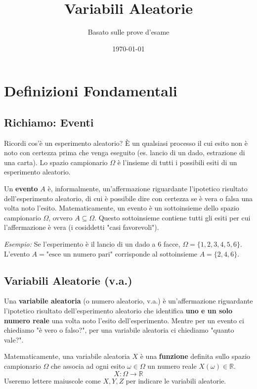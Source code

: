 

\title{Variabili Aleatorie}
\author{Basato sulle prove d'esame}
\date{\today}


\maketitle
\tableofcontents
\newpage

\section{Definizioni Fondamentali}

\subsection{Richiamo: Eventi}
Ricordi cos'è un esperimento aleatorio? È un qualsiasi processo il cui esito non è noto con certezza prima che venga eseguito (es. lancio di un dado, estrazione di una carta).
Lo spazio campionario $\Omega$ è l'insieme di tutti i possibili esiti di un esperimento aleatorio.

Un \textbf{evento} $A$ è, informalmente, un'affermazione riguardante l'ipotetico risultato dell'esperimento aleatorio, di cui è possibile dire con certezza se è vera o falsa una volta noto l'esito. Matematicamente, un evento è un sottoinsieme dello spazio campionario $\Omega$, ovvero $A \subseteq \Omega$. Questo sottoinsieme contiene tutti gli esiti per cui l'affermazione è vera (i cosiddetti "casi favorevoli").

\textit{Esempio:}
Se l'esperimento è il lancio di un dado a 6 facce, $\Omega = \{1, 2, 3, 4, 5, 6\}$.
L'evento $A = \text{"esce un numero pari"}$ corrisponde al sottoinsieme $A = \{2, 4, 6\}$.

\subsection{Variabili Aleatorie (v.a.)}
Una \textbf{variabile aleatoria} (o numero aleatorio, v.a.) è un'affermazione riguardante l'ipotetico risultato dell'esperimento aleatorio che identifica \textbf{uno e un solo numero reale} una volta noto l'esito dell'esperimento.
Mentre per un evento ci chiediamo "è vero o falso?", per una variabile aleatoria ci chiediamo "quanto vale?".

Matematicamente, una variabile aleatoria $X$ è una \textbf{funzione} definita sullo spazio campionario $\Omega$ che associa ad ogni esito $\omega \in \Omega$ un numero reale $X(\omega) \in \mathbb{R}$.
\[ X: \Omega \to \mathbb{R} \]
Useremo lettere maiuscole come $X, Y, Z$ per indicare le variabili aleatorie.

